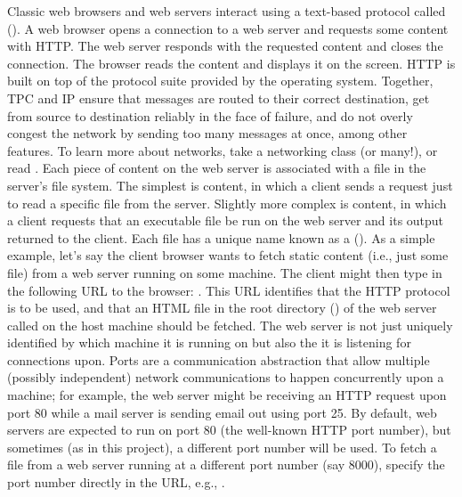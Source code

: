 {}Classic web browsers and web servers interact using a text-based protocol called  (). A web browser opens a connection to a web server and requests some content with HTTP. The web server responds with the requested content and closes the connection. The browser reads the content and displays it on the screen.\markdownRendererInterblockSeparator
{}HTTP is built on top of the  protocol suite provided by the operating system. Together, TPC and IP ensure that messages are routed to their correct destination, get from source to destination reliably in the face of failure, and do not overly congest the network by sending too many messages at once, among other features. To learn more about networks, take a networking class (or many!), or read .\markdownRendererInterblockSeparator
{}Each piece of content on the web server is associated with a file in the server's file system. The simplest is  content, in which a client sends a request just to read a specific file from the server. Slightly more complex is  content, in which a client requests that an executable file be run on the web server and its output returned to the client. Each file has a unique name known as a  (). \markdownRendererInterblockSeparator
{}As a simple example, let's say the client browser wants to fetch static content (i.e., just some file) from a web server running on some machine. The client might then type in the following URL to the browser: . This URL identifies that the HTTP protocol is to be used, and that an HTML file in the root directory (\markdownRendererCodeSpan{/}) of the web server called  on the host machine  should be fetched.\markdownRendererInterblockSeparator
{}The web server is not just uniquely identified by which machine it is running on but also the  it is listening for connections upon. Ports are a communication abstraction that allow multiple (possibly independent) network communications to happen concurrently upon a machine; for example, the web server might be receiving an HTTP request upon port 80 while a mail server is sending email out using port 25. By default, web servers are expected to run on port 80 (the well-known HTTP port number), but sometimes (as in this project), a different port number will be used. To fetch a file from a web server running at a different port number (say 8000), specify the port number directly in the URL, e.g., .\markdownRendererInterblockSeparator
